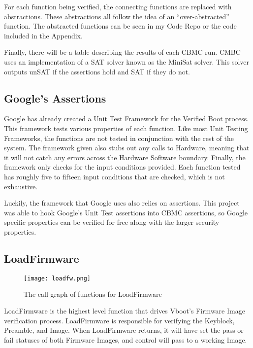 For each function being verified, the connecting functions are replaced with
abstractions.
These abstractions all follow the idea of an ``over-abstracted'' function.
The abstracted functions can be seen in my Code Repo or the code included in the
Appendix.

Finally, there will be a table describing the results of each CBMC run.
CMBC uses an implementation of a SAT solver known as the MiniSat solver\cite{minisat}.
This solver outputs unSAT if the assertions hold and SAT if they do not. 

\subsection{Google's Assertions}

Google has already created a Unit Test Framework for the Verified Boot process.
This framework tests various properties of each function.
Like most Unit Testing Frameworks, the functions are not tested in conjunction
with the rest of the system.
The framework given also stubs out any calls to Hardware, meaning that it 
will not catch any errors across the Hardware Software boundary.
Finally, the framework only checks for the input conditions provided. 
Each function tested has roughly five to fifteen input conditions that are
checked, which is not exhaustive.

Luckily, the framework that Google uses also relies on assertions.
This project was able to hook Google's Unit Test assertions into CBMC
assertions, so Google specific properties can be verified for free along with 
the larger security properties. 

\subsection{LoadFirmware}

\begin{figure}[!htbp]
  \centering
  \texttt{[image: loadfw.png]}
  \caption[LoadFirmware Call Graph]{The call graph of functions for LoadFirmware}\label{fig:loadfw}
\end{figure}

LoadFirmware is the highest level function that drives Vboot's Firmware Image
verification process.
LoadFirmware is responsible for verifying the Keyblock, Preamble, and Image.
When LoadFirmware returns, it will have set the pass or fail statuses of both Firmware Images, and control will pass to a working Image.

